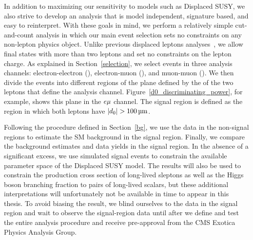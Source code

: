 In addition to maximizing our sensitivity to models such as Displaced SUSY, we also strive to develop an analysis that is model independent, signature based, and easy to reinterpret. With these goals in mind, we perform a relatively simple cut-and-count analysis in which our main event selection sets no constraints on any non-lepton physics object. Unlike previous displaced leptons analyses~\cite{displaced_leptons_run1, displaced_leptons_bing}, we allow final states with more than two leptons and set no constraints on the lepton charge. As explained in Section~\ref{selection}, we select events in three analysis channels: electron-electron (\Pe\Pe), electron-muon (\Pe\Pgm), and muon-muon (\Pgm\Pgm). We then divide the events into different regions of the plane defined by the \ad of the two leptons that define the analysis channel. Figure~\ref{d0_discriminating_power}, for example, shows this plane in the $e{\mu}$ channel. The signal region is defined as the region in which both leptons have $\ad>\SI{100}{\um}$.

Following the procedure defined in Section~\ref{bg}, we use the data in the non-signal regions to estimate the SM background in the signal region. Finally, we compare the background estimates and data yields in the signal region. In the absence of a significant excess, we use simulated signal events to constrain the available parameter space of the Displaced SUSY model. The results will also be used to constrain the production cross section of long-lived sleptons as well as the Higgs boson branching fraction to pairs of long-lived scalars, but these additional interpretations will unfortunately not be available in time to appear in this thesis. To avoid biasing the result, we blind ourselves to the data in the signal region and wait to observe the signal-region data until after we define and test the entire analysis procedure and receive pre-approval from the CMS Exotica Physics Analysis Group.

\pagebreak